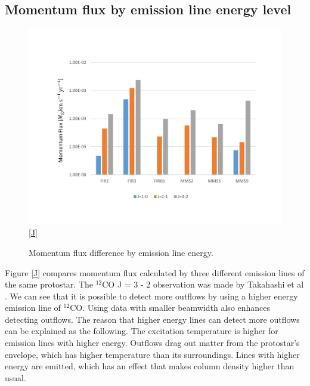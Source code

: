 \newpage

\subsection{Momentum flux by emission line energy level}

\begin{figure}[h!]
	\centering
	\includegraphics[width=\textwidth]{outflow_J}
	\ref{J}
	\caption{Momentum flux difference by emission line energy.}
\end{figure}

Figure \ref{J} compares momentum flux calculated by three different emission lines of the same protostar. The $^{12}$CO J = 3 - 2 observation was made by Takahashi et al \cite{takahashi2008millimeter}. We can see that it is possible to detect more outflows by using a higher energy emission line of $^{12}$CO. Using data with smaller beamwidth also enhances detecting outflows. The reason that higher energy lines can detect more outflows can be explained as the following. The excitation temperature is higher for emission lines with higher energy. Outflows drag out matter from the protostar's envelope, which has higher temperature than its surroundings. Lines with higher energy are emitted, which has an effect that makes column density higher than usual.
